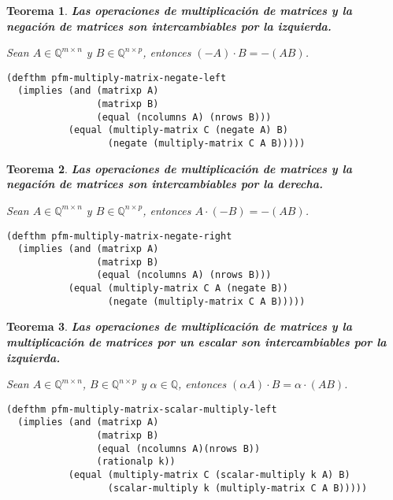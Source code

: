 \documentclass[a4paper,10pt]{article}
\newcommand{\Q}[1]{#1 \in \mathbb{Q}}
\newcommand{\M}[3]{#1 \in \mathbb{Q}^{#2 \times #3}}
\newtheorem{teor}{{Teorema}}
\begin{document}
\par \vspace{16pt}

\begin{teor} \textbf{Las operaciones de multiplicación de matrices y la negación de matrices son intercambiables por la izquierda.}\vspace{8pt}\par
Sean $\M{A}{m}{n}$ y $\M{B}{n}{p}$, entonces $(-A)\cdot B = -(AB)$.
\end{teor}

\begin{lstlisting}[language=clips]
(defthm pfm-multiply-matrix-negate-left
  (implies (and (matrixp A)
                (matrixp B)
                (equal (ncolumns A) (nrows B)))
           (equal (multiply-matrix C (negate A) B)
                  (negate (multiply-matrix C A B)))))
\end{lstlisting}

\par \vspace{16pt}

\begin{teor} \textbf{Las operaciones de multiplicación de matrices y la negación de matrices son intercambiables por la derecha.}\vspace{8pt}\par
Sean $\M{A}{m}{n}$ y $\M{B}{n}{p}$, entonces $A\cdot (-B) = -(AB)$.
\end{teor}

\begin{lstlisting}[language=clips]
(defthm pfm-multiply-matrix-negate-right
  (implies (and (matrixp A)
                (matrixp B)
                (equal (ncolumns A) (nrows B)))
           (equal (multiply-matrix C A (negate B))
                  (negate (multiply-matrix C A B)))))
\end{lstlisting}

\par \vspace{16pt}

\begin{teor} \textbf{Las operaciones de multiplicación de matrices y la multiplicación de matrices por un escalar son intercambiables por la izquierda.}\vspace{8pt}\par
Sean $\M{A}{m}{n}$, $\M{B}{n}{p}$ y $\Q{\alpha}$, entonces $(\alpha A)\cdot B = \alpha\cdot(AB)$.
\end{teor}

\begin{lstlisting}[language=clips]
(defthm pfm-multiply-matrix-scalar-multiply-left
  (implies (and (matrixp A)
                (matrixp B)
                (equal (ncolumns A)(nrows B))
                (rationalp k))
           (equal (multiply-matrix C (scalar-multiply k A) B)
                  (scalar-multiply k (multiply-matrix C A B)))))
\end{lstlisting}
\end{document}
